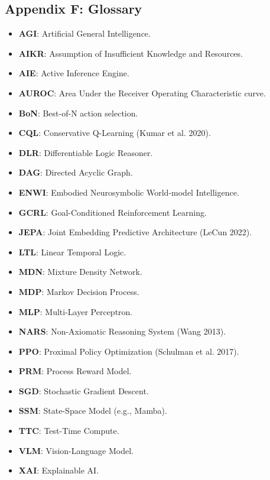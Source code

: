 \documentclass[11pt]{article}
\begin{document}
\hrulefill

\subsection{Appendix F: Glossary}

\begin{itemize}
  \item \textbf{AGI}: Artificial General Intelligence.
  \item \textbf{AIKR}: Assumption of Insufficient Knowledge and Resources.
  \item \textbf{AIE}: Active Inference Engine.
  \item \textbf{AUROC}: Area Under the Receiver Operating Characteristic curve.
  \item \textbf{BoN}: Best-of-N action selection.
  \item \textbf{CQL}: Conservative Q-Learning (Kumar et al. 2020).
  \item \textbf{DLR}: Differentiable Logic Reasoner.
  \item \textbf{DAG}: Directed Acyclic Graph.
  \item \textbf{ENWI}: Embodied Neurosymbolic World-model Intelligence.
  \item \textbf{GCRL}: Goal-Conditioned Reinforcement Learning.
  \item \textbf{JEPA}: Joint Embedding Predictive Architecture (LeCun 2022).
  \item \textbf{LTL}: Linear Temporal Logic.
  \item \textbf{MDN}: Mixture Density Network.
  \item \textbf{MDP}: Markov Decision Process.
  \item \textbf{MLP}: Multi-Layer Perceptron.
  \item \textbf{NARS}: Non-Axiomatic Reasoning System (Wang 2013).
  \item \textbf{PPO}: Proximal Policy Optimization (Schulman et al. 2017).
  \item \textbf{PRM}: Process Reward Model.
  \item \textbf{SGD}: Stochastic Gradient Descent.
  \item \textbf{SSM}: State-Space Model (e.g., Mamba).
  \item \textbf{TTC}: Test-Time Compute.
  \item \textbf{VLM}: Vision-Language Model.
  \item \textbf{XAI}: Explainable AI.
\end{itemize}
\end{document}
